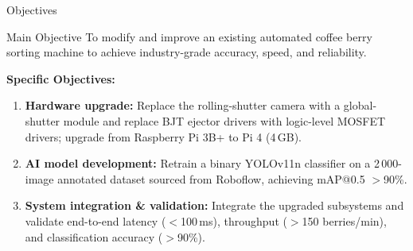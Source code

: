 \documentclass[aspectratio=169, 11pt]{beamer}
\begin{document}
\begin{frame}{Objectives}
\begin{block}{Main Objective}
To modify and improve an existing automated coffee berry sorting machine to
achieve industry-grade accuracy, speed, and reliability.
\end{block}
\vspace{0.5em}
\textbf{Specific Objectives:}
\begin{enumerate}
  \item \textbf{Hardware upgrade:} Replace the rolling-shutter camera with a
        global-shutter module and replace BJT ejector drivers with logic-level
        MOSFET drivers; upgrade from Raspberry Pi 3B+ to Pi 4 (4\,GB).
  \item \textbf{AI model development:} Retrain a binary YOLOv11n classifier on a
        2\,000-image annotated dataset sourced from Roboflow, achieving
        mAP@0.5 $>$90\%.
  \item \textbf{System integration \& validation:} Integrate the upgraded subsystems
        and validate end-to-end latency ($<$100\,ms), throughput
        ($>$150 berries/min), and classification accuracy ($>$90\%).
\end{enumerate}
\end{frame}
\end{document}
